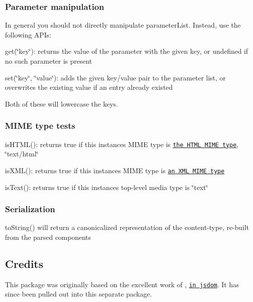 \subsubsection*{Parameter manipulation}

In general you should not directly manipulate {\ttfamily parameter\+List}. Instead, use the following A\+P\+Is\+:


\begin{DoxyItemize}
\item {\ttfamily get(\char`\"{}key\char`\"{})}\+: returns the value of the parameter with the given key, or {\ttfamily undefined} if no such parameter is present
\item {\ttfamily set(\char`\"{}key\char`\"{}, \char`\"{}value\char`\"{})}\+: adds the given key/value pair to the parameter list, or overwrites the existing value if an entry already existed
\end{DoxyItemize}

Both of these will lowercase the keys.

\subsubsection*{M\+I\+ME type tests}


\begin{DoxyItemize}
\item {\ttfamily is\+H\+T\+M\+L()}\+: returns true if this instance\textquotesingle{}s M\+I\+ME type is \href{https://html.spec.whatwg.org/multipage/infrastructure.html#html-mime-type}{\tt the H\+T\+ML M\+I\+ME type}, {\ttfamily \char`\"{}text/html\char`\"{}}
\item {\ttfamily is\+X\+M\+L()}\+: returns true if this instance\textquotesingle{}s M\+I\+ME type is \href{https://html.spec.whatwg.org/multipage/infrastructure.html#xml-mime-type}{\tt an X\+ML M\+I\+ME type}
\item {\ttfamily is\+Text()}\+: returns true if this instance\textquotesingle{}s top-\/level media type is {\ttfamily \char`\"{}text\char`\"{}}
\end{DoxyItemize}

\subsubsection*{Serialization}


\begin{DoxyItemize}
\item {\ttfamily to\+String()} will return a canonicalized representation of the content-\/type, re-\/built from the parsed components
\end{DoxyItemize}

\subsection*{Credits}

This package was originally based on the excellent work of \href{https://github.com/nicolashenry}{\tt }, \href{https://github.com/tmpvar/jsdom/blob/16fd85618f2705d181232f6552125872a37164bc/lib/jsdom/living/helpers/headers.js}{\tt in jsdom}. It has since been pulled out into this separate package. 